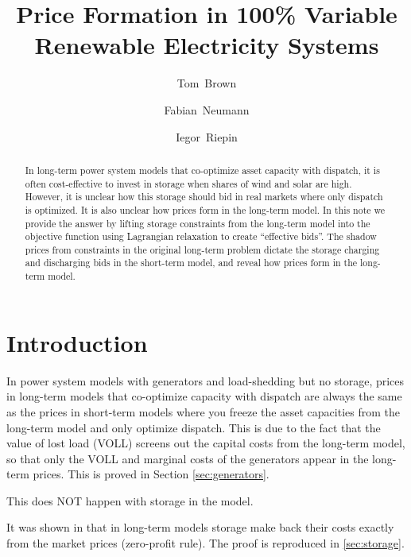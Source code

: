 \documentclass[final,3p,times]{elsarticle}
\begin{document}
\begin{frontmatter}

  \title{Price Formation in 100\% Variable Renewable Electricity Systems}

  \author[tub]{Tom~Brown}
  \author[tub]{Fabian~Neumann}
  \author[tub]{Iegor~Riepin}

  \address[tub]{Department of Digital Transformation in Energy Systems, Institute of Energy Technology, Technische Universität Berlin (TUB), Einsteinufer 25 (TA 8), 10587, Berlin, Germany}


  \begin{abstract}
    In long-term power system models that co-optimize asset capacity with
    dispatch, it is often cost-effective to invest in storage when shares of
    wind and solar are high. However, it is unclear how this storage should bid
    in real markets where only dispatch is optimized. It is also unclear how
    prices form in the long-term model. In this note we provide the answer by
    lifting storage constraints from the long-term model into the objective
    function using Lagrangian relaxation to create ``effective bids''. The
    shadow prices from constraints in the original long-term problem dictate the
    storage charging and discharging bids in the short-term model, and reveal
    how prices form in the long-term model.
  \end{abstract}

\end{frontmatter}

\section{Introduction}

In power system models with generators and load-shedding but no storage, prices
in long-term models that co-optimize capacity with dispatch are always the same
as the prices in short-term models where you freeze the asset capacities from
the long-term model and only optimize dispatch. This is due to the fact that the
value of lost load (VOLL) screens out the capital costs from the long-term
model, so that only the VOLL and marginal costs of the generators appear in the
long-term prices. This is proved in Section \ref{sec:generators}.

This does NOT happen with storage in the model.

It was shown in \cite{Brown2020} that in long-term models storage make back
their costs exactly from the market prices (zero-profit rule). The proof is
reproduced in \ref{sec:storage}.
\end{document}
